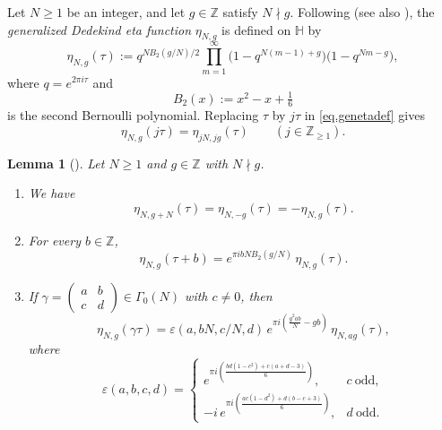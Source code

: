 \documentclass{amsart}
\newtheorem{lemma}[theorem]{Lemma}
\theoremstyle{definition}
\newcommand{\smat}[4]{\left(\begin{smallmatrix}#1&#2\\#3&#4\end{smallmatrix}\right)}
\begin{document}
{{Let $N\ge 1$ be an integer, and let $g\in\mathbb{Z}$ satisfy
$N\nmid g$. Following \cite{Yang2004} (see also \cite{Gua_RR}), the \emph{generalized Dedekind eta function}
$\eta_{N,g}$ is defined on $\mathbb{H}$ by
\begin{equation}\label{eq.genetadef}
\eta_{N,g}(\tau)
:=q^{NB_{2}(g/N)/2}
\prod_{m=1}^{\infty}
\bigl(1-q^{N(m-1)+g}\bigr)
\bigl(1-q^{Nm-g}\bigr),
\end{equation}
where $q=e^{2\pi i\tau}$ and
\begin{equation*}
B_{2}(x):=x^{2}-x+\tfrac16
\end{equation*}
is the second Bernoulli polynomial. Replacing $\tau$ by $j\tau$
in \eqref{eq.genetadef} gives
\begin{equation}\label{eq.dilation}
\eta_{N,g}(j\tau)=\eta_{jN,jg}(\tau)
\qquad (j\in\mathbb{Z}_{\ge 1}).
\end{equation}


\begin{lemma}[{\cite[Corollary~2]{Yang2004}}]
Let $N\ge1$ and $g\in\mathbb{Z}$ with $N\nmid g$.
\begin{enumerate}
\item[(i)] We have
\begin{equation}\label{eq.Nshift}
\eta_{N,g+N}(\tau)=\eta_{N,-g}(\tau)=-\eta_{N,g}(\tau).
\end{equation}
\item[(ii)] For every $b\in\mathbb{Z}$,
\begin{equation}\label{eq.translation}
\eta_{N,g}(\tau+b)=e^{\pi ibNB_{2}(g/N)}\,\eta_{N,g}(\tau).
\end{equation}
\item[(iii)] If $\gamma=\smat abcd\in\Gamma_{0}(N)$ with $c\ne0$, then
\begin{equation}\label{eq.cne0}
\eta_{N,g}(\gamma\tau)
=\varepsilon(a,bN,c/N,d)\,
e^{\pi i\left(\frac{g^{2}ab}{N}-gb\right)}\,
\eta_{N,ag}(\tau),
\end{equation}
where 
\begin{equation*}
\varepsilon(a,b,c,d)=
\begin{cases}
e^{\pi i\left(\frac{bd(1-c^{2})+c(a+d-3)}{6}\right)}, & c\ \text{odd},\\[3pt]
-i\,e^{\pi i\left(\frac{ac(1-d^{2})+d(b-c+3)}{6}\right)}, & d\ \text{odd}.
\end{cases}
\end{equation*}
\end{enumerate}
\end{lemma}

}}
\end{document}
